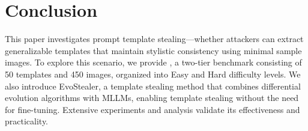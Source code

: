 \section{Conclusion}

This paper investigates prompt template stealing—whether attackers can extract generalizable templates that maintain stylistic consistency using minimal sample images. To explore this scenario, we provide \data, a two-tier benchmark consisting of 50 templates and 450 images, organized into Easy and Hard difficulty levels. We also introduce EvoStealer, a template stealing method that combines differential evolution algorithms with MLLMs, enabling template stealing without the need for fine-tuning. Extensive experiments and analysis validate its effectiveness and practicality. 

